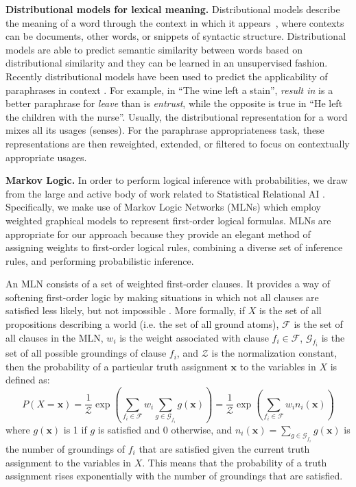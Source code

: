 \noindent\textbf{Distributional models for lexical meaning.} Distributional
models describe the meaning of a word through the context in which it
appears~\citep{landauer97:solution,lund96:producing}, where contexts can be
documents, other words, or snippets of syntactic structure. Distributional
models are able to predict semantic similarity between words based on
distributional similarity and they can be learned in an unsupervised fashion.
Recently distributional models have been used to predict the applicability of
paraphrases in context
\citep{mitchell:acl2008,erk:emnlp2008,thater:acl2010,erk:acl2010}.
For example, in ``The wine left a stain'', {\it result in} is a better
paraphrase for {\it leave} than is {\it entrust}, while the opposite is true in
``He left the children with the nurse''. Usually, the distributional
representation for a word mixes all its usages (senses). For the paraphrase
appropriateness task, these representations are then reweighted, extended, or
filtered to focus on contextually appropriate usages.

\noindent\textbf{Markov Logic.} 
In order to perform logical inference with probabilities, we draw
from the large and active body of work related to Statistical Relational AI
\citep{getoor:book2007}.  Specifically, we make use of Markov Logic Networks
(MLNs) \citep{richardson:mlj06} which employ weighted graphical models to
represent first-order logical formulas. MLNs are appropriate for our approach
because they provide an elegant method of assigning weights to first-order
logical rules, combining a diverse set of inference rules, and performing
probabilistic inference.

An MLN consists of a set of weighted first-order clauses.  It provides a way of
softening first-order logic by making situations in which not all clauses are
satisfied less likely, but not impossible \citep{richardson:mlj06}. More
formally, if $X$ is the set of all propositions describing a world (i.e. the
set of all ground atoms), $\mathcal{F}$ is the set of all clauses in the MLN,
$w_i$ is the weight associated with clause $f_i \in \mathcal{F}$,
$\mathcal{G}_{f_i}$ is the set of all possible groundings of clause $f_i$, and
$\mathcal{Z}$ is the normalization constant, then the probability of a
particular truth assignment $\mathbf{x}$ to the variables in $X$ is defined as:
\[ P(X = \mathbf{x}) = \frac{1}{\mathcal{Z}} \exp\left(\sum_{f_i \in
\mathcal{F}} w_i \sum_{g \in \mathcal{G}_{f_i}}g(\mathbf{x}) \right) =
\frac{1}{\mathcal{Z}} \exp\left(\sum_{f_i \in \mathcal{F}} w_i n_i(\mathbf{x})
\right) \tag{1}\label{e1} \] where $g(\mathbf{x})$ is 1 if $g$ is satisfied and
0 otherwise, and $n_i(\mathbf{x})= \sum_{g\in \mathcal{G}_{f_i}}g(\mathbf{x})$
is the number of groundings of $f_i$ that are satisfied given the current truth
assignment to the variables in $X$. This means that the probability of a truth
assignment rises exponentially with the number of groundings that are satisfied.

